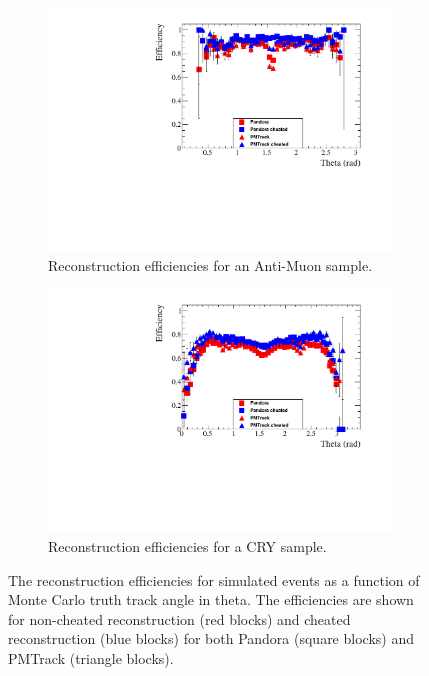 \begin{figure}[h!]
  \centering
  \begin{subfigure}{0.45\textwidth}
    \centering
    \includegraphics[width=\textwidth]{Effic_AntiMuon_500V_All_Theta}
    \caption{Reconstruction efficiencies for an Anti-Muon sample.}
    \label{fig:SimEffic_Theta_AMu}
  \end{subfigure}
  \hspace{0.08\textwidth}
  \begin{subfigure}{0.45\textwidth}
    \centering
    \includegraphics[width=\textwidth]{Effic_Cosmics_500V_All_Theta}
    \caption{Reconstruction efficiencies for a CRY sample.}
    \label{fig:SimEffic_Theta_CRY}
  \end{subfigure}
  \caption[The reconstruction efficiencies for simulated events as a function of Monte Carlo truth track angle in theta.]
          {The reconstruction efficiencies for simulated events as a function of Monte Carlo truth track angle in theta. The efficiencies are shown for non-cheated reconstruction (red blocks) and cheated reconstruction (blue blocks) for both Pandora (square blocks) and PMTrack (triangle blocks).}
          \label{fig:SimEffic_Theta}
\end{figure}

